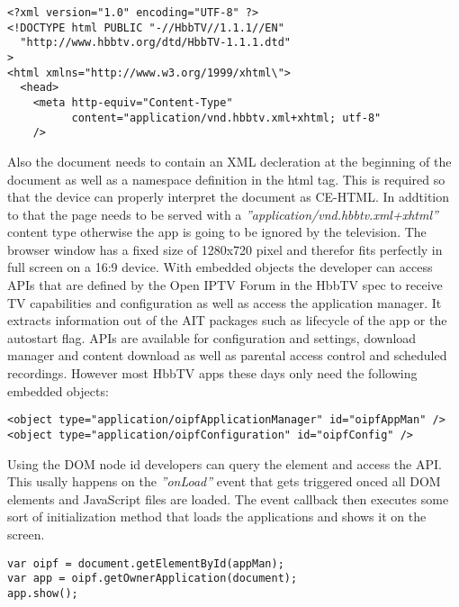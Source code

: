 \vspace{1cm}
\begin{lstlisting}[caption=Beginning of an HbbTV document,label=doctype]
<?xml version="1.0" encoding="UTF-8" ?>
<!DOCTYPE html PUBLIC "-//HbbTV//1.1.1//EN"
  "http://www.hbbtv.org/dtd/HbbTV-1.1.1.dtd"
>
<html xmlns="http://www.w3.org/1999/xhtml\">
  <head>
    <meta http-equiv="Content-Type"
          content="application/vnd.hbbtv.xml+xhtml; utf-8"
    />
\end{lstlisting}
\vspace{0.5cm}

Also the document needs to contain an XML decleration at the beginning of the document as well
as a namespace definition in the html tag. This is required so that the device can properly
interpret the document as CE-HTML. In addtition to that the page needs to be served with a
\textit{''application/vnd.hbbtv.xml+xhtml''} content type otherwise the app is going to be
ignored by the television. The browser window has a fixed size of 1280x720 pixel and therefor
fits perfectly in full screen on a 16:9 device. With embedded objects the developer can access
APIs that are defined by the Open IPTV Forum in the HbbTV spec to receive TV capabilities
and configuration as well as access the application manager. It extracts information out of
the AIT packages such as lifecycle of the app or the autostart flag. APIs are available for
configuration and settings, download manager and content download as well as parental access
control and scheduled recordings. However most HbbTV apps these days only need the following
embedded objects:

\vspace{1cm}
\begin{lstlisting}[caption=Embedded Objects used to access HbbTV APIs,label=embeddedObjects]
<object type="application/oipfApplicationManager" id="oipfAppMan" />
<object type="application/oipfConfiguration" id="oipfConfig" />
\end{lstlisting}
\vspace{0.5cm}

Using the DOM node id developers can query the element and access the API. This usally happens
on the \textit{''onLoad''} event that gets triggered onced all DOM elements and JavaScript files
are loaded. The event callback then executes some sort of initialization method that loads the
applications and shows it on the screen.

\vspace{1cm}
\begin{lstlisting}[caption=HbbTV App initialization,label=loadApp]
var oipf = document.getElementById(appMan);
var app = oipf.getOwnerApplication(document);
app.show();
\end{lstlisting}
\vspace{0.5cm}

